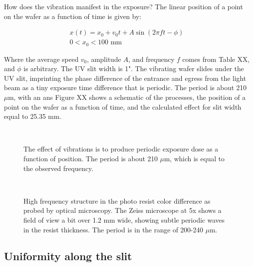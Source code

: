 How does the vibration manifest in the exposure?  The linear position of a point on the wafer as a function of time is given by:

\begin{eqnarray}
 x(t)= x_0 + v_0 t + A \sin(2\pi f t - \phi)      \nonumber \\
 0 < x_0 < 100 \text{ mm}
\end{eqnarray}

Where the average speed $v_0$, amplitude $A$, and frequency $f$ comes from Table XX, and $\phi$ is arbitrary.  The UV slit width is 1".  The vibrating wafer slides under the UV slit, imprinting the phase difference of the entrance and egress from the light beam as a tiny exposure time difference that is periodic.  The period is about 210 $\mu$m, with an ans Figure XX shows a schematic of the processes, the position of a point on the wafer as a function of time, and the calculated effect for slit width equal to 25.35 mm.  

\begin{figure}[h!] 
\begin{center}
\\
\caption[Motor vibrations schematic]{The effect of vibrations is to produce periodic exposure dose as a function of position.  The period is about 210 $\mu$m, which is equal to the observed frequency.}
\label{fig:uvvibs}
\end{center}
\end{figure}

\begin{figure}[h!] 
\begin{center}
\ 
\caption[High frequency structure in the photo resist]{High frequency structure in the photo resist color difference as probed by optical microscopy.  The Zeiss microscope at 5x shows a field of view a bit over 1.2 mm wide, showing subtle periodic waves in the resist thickness.  The period is in the range of 200-240 $\mu$m.  }
\label{fig:zeissfreq}
\end{center}
\end{figure}


\subsection{Uniformity along the slit}

